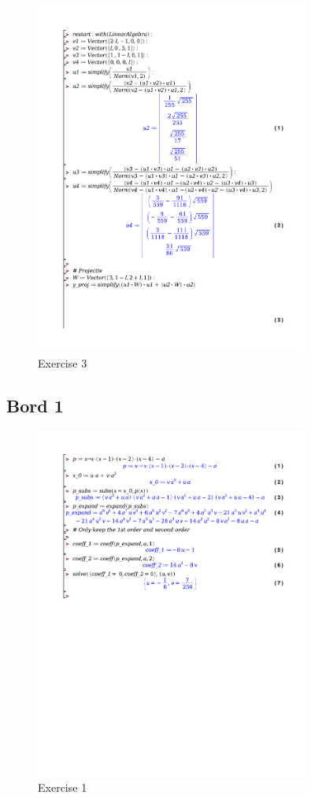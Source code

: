 \documentclass[a4paper]{report}
\begin{document}
\begin{figure}[H]
	\centering
	\includegraphics[width=0.8\textwidth]{./exercises/wc_1_ex_3.pdf}
	\caption{Exercise 3}
\end{figure}

\subsection*{Bord 1}

\begin{figure}[H]
	\centering
	\includegraphics[width=0.8\textwidth]{./exercises/bordles_1.pdf}
	\caption{Exercise 1}
\end{figure}
\end{document}

